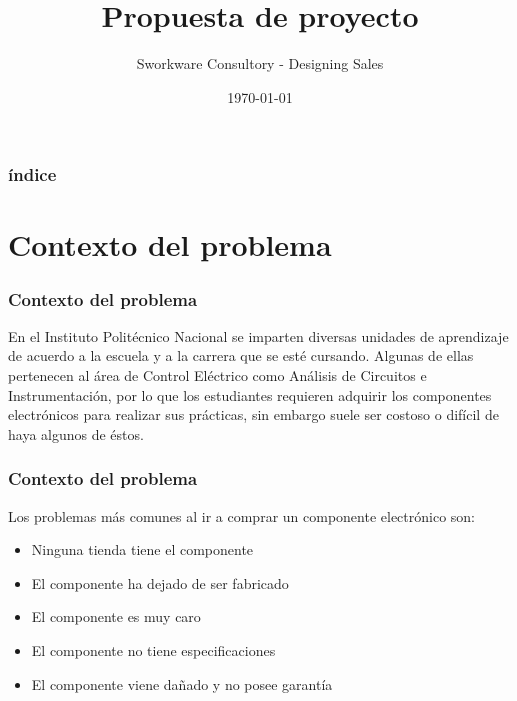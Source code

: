 \documentclass{beamer}
\title[Short title]{Propuesta de proyecto} %
\author{Sworkware Consultory - Designing Sales} %
\institute[IPN] %
{
Escuela Superior de Cómputo \\ %
\medskip
\textit{gabriela.moreno.glez@gmail.com} %
}
\date{\today} %
\begin{document}
\begin{frame}
\titlepage %
\end{frame}

\begin{frame}
\frametitle{índice} %
\tableofcontents %
\end{frame}


\section{Contexto del problema} %

\begin{frame}
\frametitle{Contexto del problema}

En el Instituto Politécnico Nacional se imparten diversas unidades de aprendizaje de acuerdo a la escuela y a la carrera que se esté cursando. Algunas de ellas pertenecen al área de Control Eléctrico como Análisis de Circuitos e Instrumentación, por lo que los estudiantes requieren adquirir los componentes electrónicos para realizar sus prácticas, sin embargo suele ser costoso o difícil de haya algunos de éstos.

\end{frame}


\begin{frame}
\frametitle{Contexto del problema}
Los problemas más comunes al ir a comprar un componente electrónico son:
\begin{itemize}
\item Ninguna tienda tiene el componente
\item El componente ha dejado de ser fabricado
\item El componente es muy caro
\item El componente no tiene especificaciones
\item El componente viene dañado y no posee garantía
\end{itemize}
\end{frame}
\end{document}
